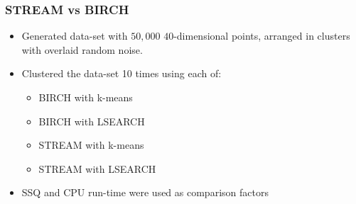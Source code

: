\documentclass{beamer}
\begin{document}
\frame
{
  \frametitle{STREAM vs BIRCH}

  \begin{itemize}
	\item{Generated data-set with $50,000$ $40$-dimensional points, arranged in clusters with overlaid random noise.}
	\item{Clustered the data-set 10 times using each of:
	  \begin{itemize}
	  	\item{BIRCH with k-means}
	  	\item{BIRCH with LSEARCH}
	  	\item{STREAM with k-means}
	  	\item{STREAM with LSEARCH}
	  \end{itemize}	   
	}
	\item{SSQ and CPU run-time were used as comparison factors}
  \end{itemize}

}
\end{document}
